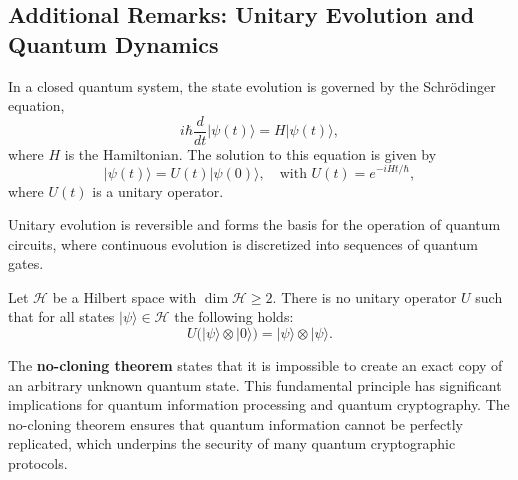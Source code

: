 
\subsection{Additional Remarks: Unitary Evolution and Quantum Dynamics}
\label{subsec:unitary_evolution}

\begin{definition}
In a closed quantum system, the state evolution is governed by the Schrödinger equation,
\[
i\hbar \frac{d}{dt} |\psi(t)\rangle = H |\psi(t)\rangle,
\]
where \(H\) is the Hamiltonian. The solution to this equation is given by
\[
|\psi(t)\rangle = U(t)|\psi(0)\rangle, \quad \text{with } U(t)=e^{-iHt/\hbar},
\]
where \(U(t)\) is a unitary operator.
\end{definition}

\begin{remark}
Unitary evolution is reversible and forms the basis for the operation of quantum circuits, where continuous evolution is discretized into sequences of quantum gates.
\end{remark}

\begin{theorem}
    Let \(\mathcal{H}\) be a Hilbert space with \(\dim \mathcal{H} \ge 2\). There is no unitary operator \(U\) such that for all states \(|\psi\rangle \in \mathcal{H}\) the following holds:
    \[
    U\big(|\psi\rangle \otimes |0\rangle\big) = |\psi\rangle \otimes |\psi\rangle.
    \]
\end{theorem}

\begin{observation}
    The \textbf{no-cloning theorem} states that it is impossible to create an exact copy of an arbitrary unknown quantum state. This fundamental principle has significant implications for quantum information processing and quantum cryptography.
    The no-cloning theorem ensures that quantum information cannot be perfectly replicated, which underpins the security of many quantum cryptographic protocols.
\end{observation}